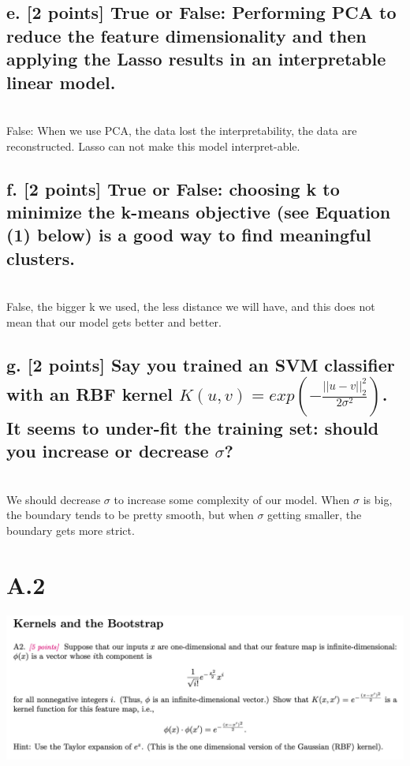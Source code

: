 \documentclass{article}
\begin{document}
\subsection*{e. [2 points] True or False: Performing PCA to reduce the feature dimensionality and then applying the Lasso results in an interpretable linear model.}
 \\
False: When we use PCA, the data lost the interpretability, the data are reconstructed. Lasso can not make this model interpret-able.

\subsection*{f. [2 points] True or False: choosing k to minimize the k-means objective (see Equation (1) below) is a good way to find meaningful clusters.}
 \\
False, the bigger k we used, the less distance we will have, and this does not mean that our model gets better and better. 

\subsection*{g. [2 points] Say you trained an SVM classifier with an RBF kernel $ K(u, v) = exp( - \frac{||u-v||^2_2}{ 2\sigma^2 } ) $. It seems to under-fit the training set: should you increase or decrease $ \sigma$?}
 \\
We should decrease $\sigma$ to increase some complexity of our model. When $\sigma$ is big, the boundary tends to be pretty smooth, but when $\sigma$ getting smaller, the boundary gets more strict.



\section*{A.2}
\includegraphics[width=16cm]{img/A2.png}
\end{document}

